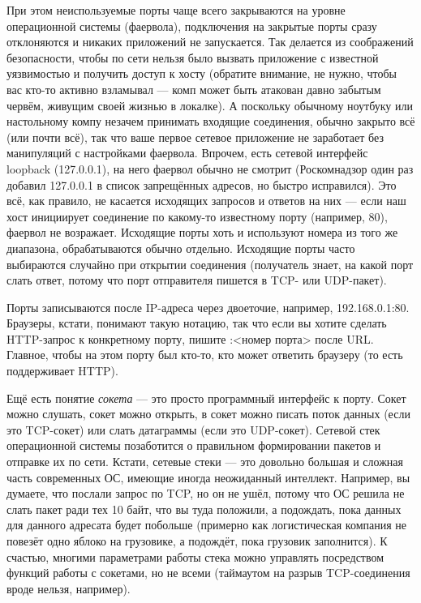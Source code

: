 \documentclass[a5paper]{article}
\begin{document}
При этом неиспользуемые порты чаще всего закрываются на уровне операционной системы (фаервола), подключения на закрытые порты сразу отклоняются и никаких приложений не запускается. Так делается из соображений безопасности, чтобы по сети нельзя было вызвать приложение с известной уязвимостью и получить доступ к хосту (обратите внимание, не нужно, чтобы вас кто-то активно взламывал --- комп может быть атакован давно забытым червём, живущим своей жизнью в локалке). А поскольку обычному ноутбуку или настольному компу незачем принимать входящие соединения, обычно закрыто всё (или почти всё), так что ваше первое сетевое приложение не заработает без манипуляций с настройками фаервола. Впрочем, есть сетевой интерфейс loopback (127.0.0.1), на него фаервол обычно не смотрит (Роскомнадзор один раз добавил 127.0.0.1 в список запрещённых адресов, но быстро исправился). Это всё, как правило, не касается исходящих запросов и ответов на них --- если наш хост инициирует соединение по какому-то известному порту (например, 80), фаервол не возражает. Исходящие порты хоть и используют номера из того же диапазона, обрабатываются обычно отдельно. Исходящие порты часто выбираются случайно при открытии соединения (получатель знает, на какой порт слать ответ, потому что порт отправителя пишется в TCP- или UDP-пакет). 

Порты записываются после IP-адреса через двоеточие, например, 192.168.0.1:80. Браузеры, кстати, понимают такую нотацию, так что если вы хотите сделать HTTP-запрос к конкретному порту, пишите :<номер порта> после URL. Главное, чтобы на этом порту был кто-то, кто может ответить браузеру (то есть поддерживает HTTP).

Ещё есть понятие \textit{сокета} --- это просто программный интерфейс к порту. Сокет можно слушать, сокет можно открыть, в сокет можно писать поток данных (если это TCP-сокет) или слать датаграммы (если это UDP-сокет). Сетевой стек операционной системы позаботится о правильном формировании пакетов и отправке их по сети. Кстати, сетевые стеки --- это довольно большая и сложная часть современных ОС, имеющие иногда неожиданный интеллект. Например, вы думаете, что послали запрос по TCP, но он не ушёл, потому что ОС решила не слать пакет ради тех 10 байт, что вы туда положили, а подождать, пока данных для данного адресата будет побольше (примерно как логистическая компания не повезёт одно яблоко на грузовике, а подождёт, пока грузовик заполнится). К счастью, многими параметрами работы стека можно управлять посредством функций работы с сокетами, но не всеми (таймаутом на разрыв TCP-соединения вроде нельзя, например).
\end{document}
